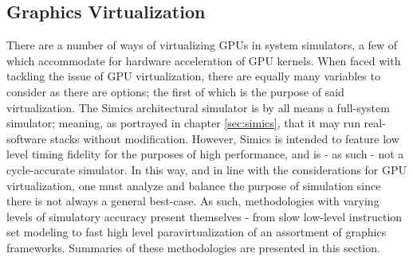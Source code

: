 

\subsection{Graphics Virtualization}
\label{sec:backgroundandrelatedwork_graphicsvirtualization}
There are a number of ways of virtualizing GPUs in system simulators, a few of which accommodate for hardware acceleration of GPU kernels.
When faced with tackling the issue of GPU virtualization, there are equally many variables to consider as there are options; the first of which is the purpose of said virtualization.
The Simics architectural simulator is by all means a full-system simulator; meaning, as portrayed in chapter \ref{sec:simics}, that it may run real-software stacks without modification.
However, Simics is intended to feature low level timing fidelity for the purposes of high performance, and is - as such - not a cycle-accurate simulator.
In this way, and in line with the considerations for GPU virtualization, one must analyze and balance the purpose of simulation since there is not always a general best-case.
As such, methodologies with varying levels of simulatory accuracy present themselves - from slow low-level instruction set modeling to fast high level paravirtualization of an assortment of graphics frameworks.
Summaries of these methodologies are presented in this section.

